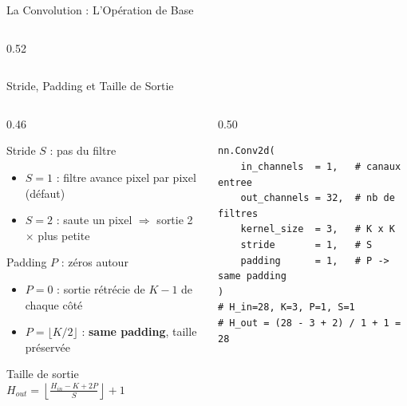 \documentclass[aspectratio=169, 10pt]{beamer}
\begin{document}
\begin{frame}{La Convolution : L'Opération de Base}
\begin{columns}[T]
\begin{column}{0.52\textwidth}
    \end{column}
  \end{columns}
\end{frame}

\begin{frame}[fragile]{Stride, Padding et Taille de Sortie}
  \begin{columns}[T]
    \begin{column}{0.46\textwidth}
      \begin{block}{Stride $S$ : pas du filtre}
        \begin{itemize}\small
          \item $S=1$ : filtre avance pixel par pixel (défaut)
          \item $S=2$ : saute un pixel $\Rightarrow$ sortie 2$\times$ plus petite
        \end{itemize}
      \end{block}
      \vspace{-4pt}
      \begin{block}{Padding $P$ : zéros autour}
        \begin{itemize}\small
          \item $P=0$ : sortie rétrécie de $K{-}1$ de chaque côté
          \item $P=\lfloor K/2 \rfloor$ : \textbf{same padding}, taille préservée
        \end{itemize}
      \end{block}
      \vspace{-4pt}
      \begin{exampleblock}{Taille de sortie}
        \centering $\displaystyle H_{out} = \left\lfloor \frac{H_{in} - K + 2P}{S} \right\rfloor + 1$
      \end{exampleblock}
    \end{column}
    \begin{column}{0.50\textwidth}
      \begin{lstlisting}[style=pythonstyle, basicstyle=\ttfamily\scriptsize]
nn.Conv2d(
    in_channels  = 1,   # canaux entree
    out_channels = 32,  # nb de filtres
    kernel_size  = 3,   # K x K
    stride       = 1,   # S
    padding      = 1,   # P -> same padding
)
# H_in=28, K=3, P=1, S=1
# H_out = (28 - 3 + 2) / 1 + 1 = 28
      \end{lstlisting}
    \end{column}
  \end{columns}
\end{frame}
\end{document}
